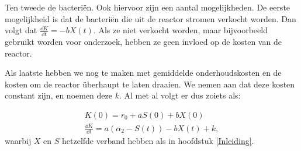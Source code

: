 Ten tweede de bacteri\"en. Ook hiervoor zijn een aantal mogelijkheden. De eerste mogelijkheid is dat de bacteri\"en die uit de reactor stromen verkocht worden. Dan volgt dat $\frac{\dd K}{\dd t} = -bX(t)$. Als ze niet verkocht worden, maar bijvoorbeeld gebruikt worden voor onderzoek, hebben ze geen invloed op de kosten van de reactor. 

Als laatste hebben we nog te maken met gemiddelde onderhoudskosten en de kosten om de reactor \"uberhaupt te laten draaien. We nemen aan dat deze kosten constant zijn, en noemen deze $k$. Al met al volgt er dus zoiets als:

\begin{align*}
	K(0) = r_0 + aS(0) + bX(0) \\
	\frac{\dd K}{\dd t} = a (\alpha_2 - S(t)) - bX(t) + k,
\end{align*}
waarbij $X$ en $S$ hetzelfde verband hebben als in hoofdstuk \ref{Inleiding}.
